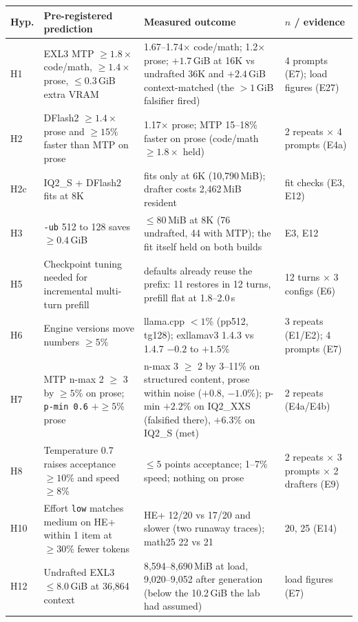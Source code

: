 \documentclass[11pt]{article}
\newcommand{\q}[1]{\texttt{#1}}
\begin{document}
\begin{table}[p]
\centering
\scriptsize
\renewcommand{\arraystretch}{1.0}
\setlength{\tabcolsep}{2pt}
\fontsize{8pt}{9pt}\selectfont
\begin{tabular}{L{0.85cm}L{5.0cm}L{6.95cm}L{3.05cm}}
\toprule
Hyp. & Pre-registered prediction & Measured outcome & $n$ / evidence \\
\midrule
H1 & EXL3 MTP $\ge1.8\times$ code/math, $\ge1.4\times$ prose, $\le0.3$\,GiB extra VRAM & 1.67--1.74$\times$ code/math; 1.2$\times$ prose; $+1.7$\,GiB at 16K vs undrafted 36K and $+2.4$\,GiB context-matched (the $>1$\,GiB falsifier fired) & 4 prompts (E7); load figures (E27) \\
H2 & DFlash2 $\ge1.4\times$ prose and $\ge15\%$ faster than MTP on prose & 1.17$\times$ prose; MTP 15--18\% faster on prose (code/math $\ge1.8\times$ held) & 2 repeats $\times$ 4 prompts (E4a) \\
H2c & IQ2\_S + DFlash2 fits at 8K & fits only at 6K (10,790\,MiB); drafter costs 2,462\,MiB resident & fit checks (E3, E12) \\
H3 & \q{-ub} 512 to 128 saves $\ge0.4$\,GiB & $\le80$\,MiB at 8K (76 undrafted, 44 with MTP); the fit itself held on both builds & E3, E12 \\
H5 & Checkpoint tuning needed for incremental multi-turn prefill & defaults already reuse the prefix: 11 restores in 12 turns, prefill flat at 1.8--2.0\,s & 12 turns $\times$ 3 configs (E6) \\
H6 & Engine versions move numbers $\ge5\%$ & llama.cpp $<1\%$ (pp512, tg128); exllamav3 1.4.3 vs 1.4.7 $-0.2$ to $+1.5\%$ & 3 repeats (E1/E2); 4 prompts (E7) \\
H7 & MTP n-max 2 $\ge$ 3 by $\ge5\%$ on prose; \q{p-min 0.6} $+\ge5\%$ prose & n-max 3 $\ge$ 2 by 3--11\% on structured content, prose within noise ($+0.8$, $-1.0\%$); p-min $+2.2\%$ on IQ2\_XXS (falsified there), $+6.3\%$ on IQ2\_S (met) & 2 repeats (E4a/E4b) \\
H8 & Temperature 0.7 raises acceptance $\ge10\%$ and speed $\ge8\%$ & $\le5$ points acceptance; 1--7\% speed; nothing on prose & 2 repeats $\times$ 3 prompts $\times$ 2 drafters (E9) \\
H10 & Effort \q{low} matches medium on HE+ within 1 item at $\ge30\%$ fewer tokens & HE+ 12/20 vs 17/20 and slower (two runaway traces); math25 22 vs 21 & 20, 25 (E14) \\
H12 & Undrafted EXL3 $\le8.0$\,GiB at 36,864 context & 8,594--8,690\,MiB at load, 9,020--9,052 after generation (below the 10.2\,GiB the lab had assumed) & load figures (E7) \\

\end{tabular}
\end{table}
\end{document}
